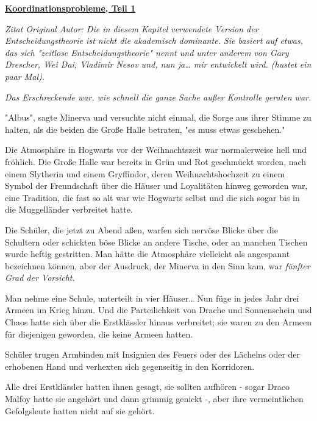 

\hypertarget{koordinationsprobleme-teil-1}{%

\textbf{\uline{Koordinationsprobleme, Teil 1}}

\emph{Zitat Original Autor: Die in diesem Kapitel verwendete Version der Entscheidungstheorie ist nicht die akademisch dominante. Sie basiert auf etwas, das sich "zeitlose Entscheidungstheorie" nennt und unter anderem von Gary Drescher, Wei Dai, Vladimir Nesov und, nun ja… mir entwickelt wird. (hustet ein paar Mal).}

\emph{Das Erschreckende war, wie schnell die ganze Sache außer Kontrolle geraten war.}

"Albus", sagte Minerva und versuchte nicht einmal, die Sorge aus ihrer Stimme zu halten, als die beiden die Große Halle betraten, "es muss etwas geschehen."

Die Atmosphäre in Hogwarts vor der Weihnachtszeit war normalerweise hell und fröhlich. Die Große Halle war bereits in Grün und Rot geschmückt worden, nach einem Slytherin und einem Gryffindor, deren Weihnachtshochzeit zu einem Symbol der Freundschaft über die Häuser und Loyalitäten hinweg geworden war, eine Tradition, die fast so alt war wie Hogwarts selbst und die sich sogar bis in die Muggelländer verbreitet hatte.

Die Schüler, die jetzt zu Abend aßen, warfen sich nervöse Blicke über die Schultern oder schickten böse Blicke an andere Tische, oder an manchen Tischen wurde heftig gestritten. Man hätte die Atmosphäre vielleicht als angespannt bezeichnen können, aber der Ausdruck, der Minerva in den Sinn kam, war \emph{fünfter Grad der Vorsicht.}

Man nehme eine Schule, unterteilt in vier Häuser… Nun füge in jedes Jahr drei Armeen im Krieg hinzu. Und die Parteilichkeit von Drache und Sonnenschein und Chaos hatte sich über die Erstklässler hinaus verbreitet; sie waren zu den Armeen für diejenigen geworden, die keine Armeen hatten.

Schüler trugen Armbinden mit Insignien des Feuers oder des Lächelns oder der erhobenen Hand und verhexten sich gegenseitig in den Korridoren.

Alle drei Erstklässler hatten ihnen gesagt, sie sollten aufhören - sogar Draco Malfoy hatte sie angehört und dann grimmig genickt -, aber ihre vermeintlichen Gefolgsleute hatten nicht auf sie gehört.

}
